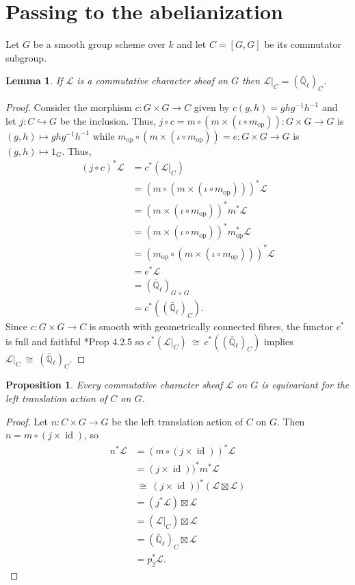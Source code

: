\documentclass[10pt]{amsart}
\theoremstyle{plain}
\newtheorem{proposition}[theorem]{Proposition}
\newtheorem{lemma}[theorem]{Lemma}
\theoremstyle{definition}
\newcommand{\EE}{\mathbb{\bar Q}_\ell}
\newcommand{\Fq}{k}
\DeclareMathOperator{\id}{id}
\newcommand{\op}{_{\operatorname{op}}}
\newcommand{\iso}{{\ \cong\ }}
\newcommand{\cs}[1]{{\mathcal{#1}}}
\begin{document}
\section{Passing to the abelianization}
 
 Let $G$ be a smooth group scheme over $\Fq$ and let $C = [G, G]$ be its commutator subgroup.

\begin{lemma}
If $\cs{L}$ is a commutative character sheaf on $G$ then $\cs{L}\vert_C = (\EE)_C$.
\end{lemma}
\begin{proof}
 Consider the morphism $c:  G \times G \to C$ given by $c(g,h)= ghg^{-1}h^{-1}$ and let $j : C \hookrightarrow G$ be the inclusion.  
Thus, $j\circ c = m\circ (m \times (\iota\circ m\op)) : G \times G \to G$ is $(g,h) \mapsto gh g^{-1}h^{-1}$ while $m\op\circ (m \times (\iota\circ m\op))= e : G \times G \to G$ is $(g,h) \mapsto 1_G$. Thus,
\begin{align*}
(j\circ c)^*\cs{L} 
&= c^* (\cs{L}\vert_C)\\
&= (m\circ (m \times (\iota\circ m\op)))^* \cs{L} \\
&= (m \times (\iota\circ m\op))^* m^* \cs{L} \\
&= (m \times (\iota\circ m\op))^* m\op^* \cs{L} \\
&= (m\op\circ (m \times (\iota\circ m\op)))^* \cs{L} \\
&= e^* \cs{L}\\
&= (\EE)_{G\times G}\\
&= c^* ((\EE)_C).
\end{align*}
Since $c : G \times G \to C$ is smooth with geometrically connected fibres,  the functor $c^*$ is full and faithful \cite{BBD}*{Prop 4.2.5}  so $c^* (\cs{L}\vert_C) \iso c^* ((\EE)_C)$ implies $\cs{L}\vert_C \iso (\EE)_C$. 
\end{proof}

 \begin{proposition}
 Every commutative character sheaf $\cs{L}$ on $G$ is equivariant for the left translation action of $C$ on $G$.
 \end{proposition}
 
 \begin{proof}
Let $n : C \times G \to G$ be the left translation action of $C$ on $G$. 
Then $n = m \circ (j \times \id)$, so
\begin{align*}
n^* \cs{L} 
&= (m \circ (j \times \id))^* \cs{L}\\
&= (j \times \id))^* m^*\cs{L}\\
&\iso (j \times \id))^* (\cs{L} \boxtimes \cs{L})\\
&= (j^*\cs{L}) \boxtimes \cs{L}\\
&= (\cs{L}\vert_C) \boxtimes \cs{L}\\
&= (\EE)_C \boxtimes \cs{L}\\
&= p_2^* \cs{L}.
\end{align*}
 \end{proof}
 
\end{document}
